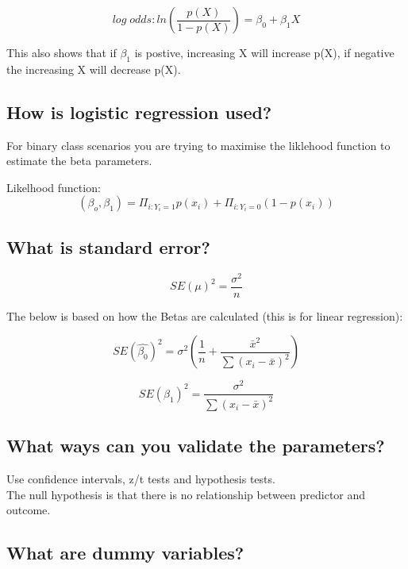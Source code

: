 \documentclass[11pt]{scrartcl} %
\begin{document}
\begin{equation}
	log\; odds: ln(\frac{p(X)}{1-p(X)}) = \beta_0 + \beta_1X
\end{equation}

This also shows that if \(\beta_1\) is postive, increasing X will increase p(X), if negative the increasing X will
decrease p(X).

\subsection{How is logistic regression used?}

For binary class scenarios you are trying to maximise the liklehood function to estimate the beta parameters.

Likelhood function:
\begin{equation}
	(\beta_o,\beta_1) = \Pi_{i:Y_i=1}p(x_i) + \Pi_{i:Y_i=0}(1-p(x_i))
\end{equation}

\subsection{What is standard error?}

\begin{equation}
	SE(\mu)^2 = \frac{\sigma^2}{n}
\end{equation}

The below is based on how the Betas are calculated (this is for linear regression):

\begin{equation}
	SE(\hat{\beta_0})^2 = \sigma^2(\frac{1}{n} + \frac{\bar{x}^2}{\sum{(x_i-\bar{x})^2}})
\end{equation}

\begin{equation}
	SE(\beta_1)^2 = \frac{\sigma^2}{\sum{(x_i-\bar{x})^2}}
\end{equation}

\subsection{What ways can you validate the parameters?}

Use confidence intervals, z/t tests and hypothesis tests.\\

The null hypothesis is that there is no relationship between predictor and outcome.

\subsection{What are dummy variables?}
\end{document}
